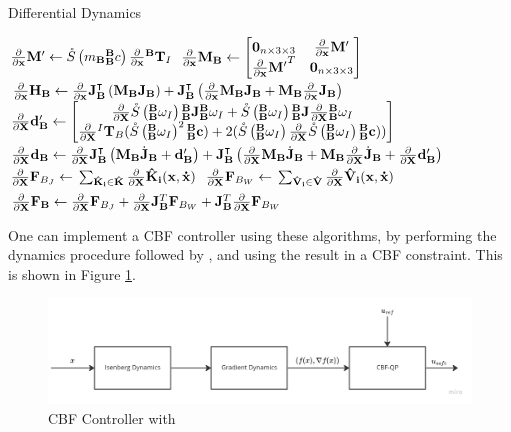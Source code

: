 \begin{algorithm}[H]
	\caption{Differential Dynamics}\label{alg:diff_dynamics}
	\begin{algorithmic}
	\State $\partialx{}\M' \gets \S{m_\B {\BB}c}\partialx{}{^\B\T_I}$
	\State $\partialx{}\M_\B \gets \begin{bmatrix}{\ZERO_{n \times 3 \times 3}} & \partialx{}\M' \\ {\partialx{}\M'}^T & \ZERO_{n \times 3 \times 3} \end{bmatrix}$
	\State $\partialx{}\H_\B \gets \partialx{}\J_\B\transpose \left(\M_\B\J_\B\right) + \J_\B\transpose  \left(\frac{\partial}{\partial \x}\M_\B\J_\B + \M_\B\frac{\partial}{\partial \x}\J_\B\right)$
	\State $\partialX{}\d_\B' \gets \begin{bmatrix}                            
	\partialX{}\S{\BB\omega_I } {\BB\J} {\BB\omega_I} + \S{\BB\omega_I }{\BB\J}\partialX{}{\BB\omega_I} \\
	\partialX{}{^I\T_B}(\S{\BB\omega_I}^2 {\BB\com}) + 2(\S{\BB\omega_I}\partialX{}\S{\BB\omega_I} {\BB\com}))\\
	\end{bmatrix}$
	\State $\partialX{}\d_\B \gets \partialX{}\J\transpose_\B \left (\M_\B \dotJ_\B + \d'_\B \right) + \J\transpose_\B \left (\partialX{} \M_\B \dotJ_\B + \M_\B \partialX{} \dotJ_\B + \partialX{} \d'_\B \right)$
	\State $\partialX{}\F_{B_J} \gets \Big.\sum_{\mathbf{\hat{K}_i} \in \mathbf{\hat{K}}}\partialX{}\mathbf{\hat{K}_i(\x, \dotx)} $
		\State $\partialX{}\F_{B_W} \gets \Big.\sum_{\mathbf{\hat{V}_i} \in \mathbf{\hat{V}}}\partialX{}\mathbf{\hat{V}_i(\x, \dotx)} $
		\State $\partialX{}\F_\B \gets \partialX{}\F_{B_J} + \partialX{}\J_\B^T \F_{B_W} + \J_\B^T \partialX{}\F_{B_W}$
	\end{algorithmic}
\end{algorithm}

One can implement a CBF controller using these algorithms, by performing the dynamics procedure followed by \algname{}, and using the result in a CBF constraint. This is shown in Figure \ref{fig:cbf_controller_complete}.

\begin{figure}[H]
    \centering
    \includegraphics[width=\textwidth]{Figures/Implementation/CBFControl.jpg}
    \caption{CBF Controller with\algname{}}
    \label{fig:cbf_controller_complete}
\end{figure}

